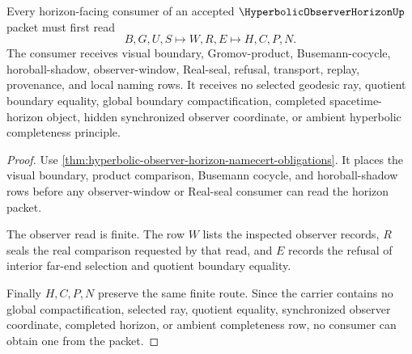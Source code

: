\begin{theorem}
\label{thm:hyperbolic-observer-horizon-boundary-handoff}
Every horizon-facing consumer of an accepted $\HyperbolicObserverHorizonUp$ packet must first read
$$
B,G,U,S \longmapsto W,R,E \longmapsto H,C,P,N .
$$
The consumer receives visual boundary, Gromov-product, Busemann-cocycle, horoball-shadow, observer-window, Real-seal, refusal, transport, replay, provenance, and local naming rows. It receives no selected geodesic ray, quotient boundary equality, global boundary compactification, completed spacetime-horizon object, hidden synchronized observer coordinate, or ambient hyperbolic completeness principle.
\end{theorem}
\begin{proof}
Use \autoref{thm:hyperbolic-observer-horizon-namecert-obligations}. It places the visual boundary, product comparison, Busemann cocycle, and horoball-shadow rows before any observer-window or Real-seal consumer can read the horizon packet.

The observer read is finite. The row $W$ lists the inspected observer records, $R$ seals the real comparison requested by that read, and $E$ records the refusal of interior far-end selection and quotient boundary equality.

Finally $H,C,P,N$ preserve the same finite route. Since the carrier contains no global compactification, selected ray, quotient equality, synchronized observer coordinate, completed horizon, or ambient completeness row, no consumer can obtain one from the packet.
\end{proof}




